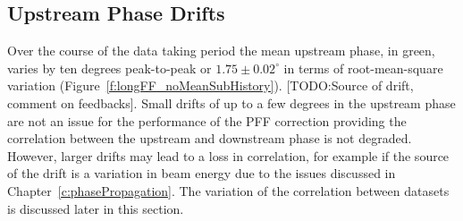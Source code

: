 
\subsection{Upstream Phase Drifts}
\label{ss:longFF_upDrifts}

Over the course of the data taking period the mean upstream phase, in green, varies by ten degrees peak-to-peak or \(1.75 \pm 0.02^\circ\) in terms of root-mean-square variation (Figure~\ref{f:longFF_noMeanSubHistory}). [TODO:Source of drift, comment on feedbacks]. Small drifts of up to a few degrees in the upstream phase are not an issue for the performance of the PFF correction providing the correlation between the upstream and downstream phase is not degraded. However, larger drifts may lead to a loss in correlation, for example if the source of the drift is a variation in beam energy due to the issues discussed in Chapter~\ref{c:phasePropagation}. The variation of the correlation between datasets is discussed later in this section.

